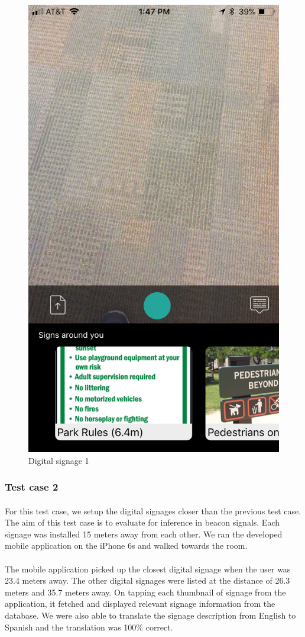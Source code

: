 \documentclass[12pt]{article}
\begin{document}
       \begin{figure}[H]
	\centering
	\includegraphics[width=0.5\linewidth]{media/test1.png}
	\caption{Digital signage 1}
	\label{fig:engyo}
\end{figure} 

\subsubsection{Test case 2}
\label{one2one}
\paragraph{}For this test case, we setup the digital signages closer than the previous test case. The aim of this test case is to evaluate for inference in beacon signals. Each signage was installed  15 meters away from each other. We ran the developed mobile application on the iPhone 6s and walked towards the room.

\paragraph{}The mobile application picked up the closest digital signage when the user was 23.4 meters away. The other digital signages were listed at the distance of 26.3 meters and 35.7 meters away. On tapping each thumbnail of signage from the application, it fetched and displayed relevant signage information from the database. We were also able to translate the signage description from English to Spanish and the translation was 100\% correct.
\end{document}

